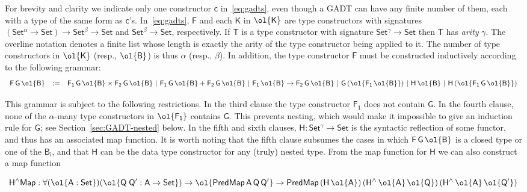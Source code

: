 \documentclass[9pt]{entcs}
\begin{document}
\noindent
For brevity and clarity we indicate only one constructor $\mathsf{c}$
in~\eqref{eq:gadts}, even though a GADT can have any finite number of
them, each with a type of the same form as
$\mathsf{c}$'s. In~\eqref{eq:gadts}, $\mathsf{F}$ and each
$\mathsf{K}$ in $\ol{\mathsf{K}}$ are type constructors with
signatures $\mathsf{(Set^{\alpha} \to Set) \to Set^{\beta} \to Set}$
and $\mathsf{Set^{\beta} \to Set}$, respectively. If $\mathsf{T}$ is a
type constructor with signature $\mathsf{Set^{\gamma} \to Set}$ then
$\mathsf{T}$ has {\em arity} $\mathsf{\gamma}$.  The
overline notation denotes a finite list whose length is exactly the
arity of the type constructor being applied to it. The number of type
constructors in $\ol{\mathsf{K}}$ (resp., $\ol{\mathsf{B}}$) is thus
$\alpha$ (resp., $\beta$). In addition, the type constructor
$\mathsf{F}$ must be constructed inductively according to the
following grammar:
\[\begin{array}{lll}
\mathsf{F\,G\,\ol{B}} & := &
\mathsf{F_1\,G\,\ol{B} \times F_2\,G\,\ol{B} \ \vert\ F_1\,G\,\ol{B} +
F_2\,G\,\ol{B} \ \vert\ F_1\,\ol{B} \to F_2\,G\,\ol{B}
\ \vert\ G\,(\ol{F_1\,\ol{B}}) \ \vert\ H\,\ol{B} \ \vert\ H\,
(\ol{F_1\,G\,\ol{B}}) }
\end{array}\]

\noindent
This grammar is subject to the following restrictions. In the third
clause the type constructor $\mathsf{F_1}$ does not contain
$\mathsf{G}$. In the fourth clause, none of the $\mathsf{\alpha}$-many
type constructors in $\mathsf{\ol{F_1}}$ contains $\mathsf{G}$. This
prevents nesting, which would {\color{red} make it impossible to give}
an induction rule for $\mathsf{G}$; see Section~\ref{sec:GADT-nested}
below. In the fifth and sixth clauses, $\mathsf{H : Set^\gamma \to
  Set}$ is the syntactic reflection of some functor, and thus has an
associated map function. It is worth noting that the fifth clause
subsumes the cases in which $\mathsf{F\,G\,\ol{B}}$ is a closed type
or one of the $\mathsf{B_i}$, and that $\mathsf{H}$ can be the data
type constructor for any (truly) nested type. From the map function
for $\mathsf{H}$ we can also construct a map function

\vspace*{-0.05in}

\begin{equation}\label{eq:hliftmap}
\mathsf{H^\wedge Map : \forall (\ol{A : Set}) (\ol{Q\;Q' : A \to Set}) 
\to \ol{PredMap\,A\,Q\,Q'} \to
PredMap\,(H\,\ol{A})\,(H^{\wedge}\,\ol{A}\,\ol{Q})\, 
(H^{\wedge}\,\ol{A}\,\ol{Q'})}
\end{equation}
\end{document}
